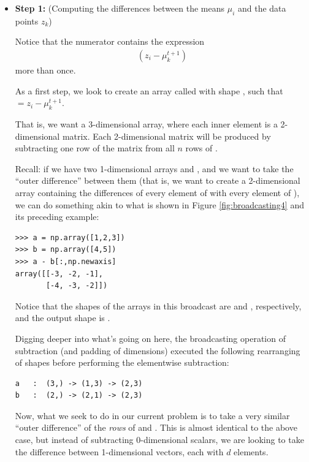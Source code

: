 \begin{itemize}
\item \textbf{Step 1:} (Computing the differences between the means $\mu_i$ and the data points $z_k$)

Notice that the numerator contains the expression 
\begin{align*}
(z_i - \mu_k^{t+1})
\end{align*}
more than once.
	
As a first step, we look to create an array called  with shape , such that \newline \noindent {} $ = z_i - \mu_k^{t+1}$. 
	
That is, we want a 3-dimensional array, where each inner element is a 2-dimensional matrix. 
Each 2-dimensional matrix will be produced by subtracting one row of the  matrix from all $n$ rows of .
	
Recall: if we have two 1-dimensional arrays  and , and we want to take the ``outer difference'' between them (that is, we want to create a 2-dimensional array containing the differences of every element of  with every element of ), we can do something akin to what is shown in Figure \ref{fig:broadcasting4} and its preceding example:

\begin{lstlisting}
>>> a = np.array([1,2,3])
>>> b = np.array([4,5])
>>> a - b[:,np.newaxis]
array([[-3, -2, -1],
       [-4, -3, -2]])
\end{lstlisting}

Notice that the shapes of the arrays in this broadcast are  and , respectively, and the output shape is .
	
Digging deeper into what's going on here, the broadcasting operation of subtraction (and padding of dimensions) executed the following rearranging of shapes before performing the elementwise subtraction:
	
\begin{lstlisting}
a	:  (3,) -> (1,3) -> (2,3)
b	:  (2,) -> (2,1) -> (2,3)
\end{lstlisting}
	
Now, what we seek to do in our current problem is to take a very similar ``outer difference'' of the \emph{rows} of  and .
This is almost identical to the above case, but instead of subtracting 0-dimensional scalars, we are looking to take the difference between 1-dimensional vectors, each with $d$ elements.
	

\end{itemize}
